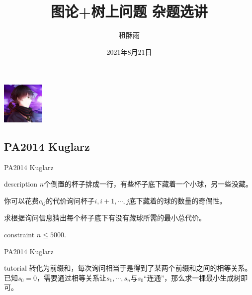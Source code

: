 \documentclass{beamer}
\title{图论+树上问题 杂题选讲}
\date{2021年8月21日}
\author{租酥雨}
\begin{document}
\small
	
	\begin{frame}
		\titlepage
		\begin{center}
			\includegraphics[width=2.0cm]{zsy.jpg}
		\end{center}
	\end{frame}


\subsection{PA2014 Kuglarz}
\begin{frame}{PA2014 Kuglarz}
	\begin{block}{description}
		$n$个倒置的杯子排成一行，有些杯子底下藏着一个小球，另一些没藏。
		
		你可以花费$c_{ij}$的代价询问杯子$i, i+1, \cdots, j$底下藏着的球的数量的奇偶性。
		
		求根据询问信息猜出每个杯子底下有没有藏球所需的最小总代价。
	\end{block}
	\begin{block}{constraint}
		$n \le 5000.$
	\end{block}
\end{frame}
\begin{frame}{PA2014 Kuglarz}
	\begin{block}{tutorial}
		转化为前缀和，每次询问相当于是得到了某两个前缀和之间的相等关系。\\
		
		已知$s_0 = 0$，需要通过相等关系让$s_1, \cdots, s_n$与$s_0$“连通”，那么求一棵最小生成树即可。
	\end{block}
\end{frame}
\end{document}
